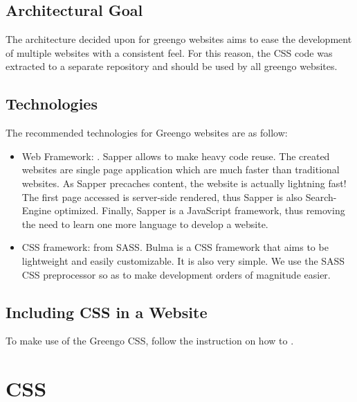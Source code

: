 \documentclass[letterpaper,10pt,english]{sphinxmanual}
\begin{document}
\subsection{Architectural Goal}
\label{\detokenize{websites/greengo_websites:architectural-goal}}
The architecture decided upon for greengo websites aims to ease the development of multiple websites with a consistent feel.
For this reason, the CSS code was extracted to a separate repository and should be used by all greengo websites.


\subsection{Technologies}
\label{\detokenize{websites/greengo_websites:technologies}}
The recommended technologies for Greengo websites are as follow:
\begin{itemize}
\item {} 
Web Framework: .
Sapper allows to make heavy code reuse.
The created websites are single page application which are much faster than traditional websites.
As Sapper precaches content, the website is actually lightning fast!
The first page accessed is server-side rendered, thus Sapper is also Search-Engine optimized.
Finally, Sapper is a JavaScript framework, thus removing the need to learn one more language to develop a website.

\item {} 
CSS framework:  from SASS.
Bulma is a CSS framework that aims to be lightweight and easily customizable.
It is also very simple.
We use the SASS CSS preprocessor so as to make development orders of magnitude easier.

\end{itemize}


\subsection{Including CSS in a Website}
\label{\detokenize{websites/greengo_websites:including-css-in-a-website}}
To make use of the Greengo CSS, follow the instruction on how to {\hyperref[\detokenize{websites/css:include-css}]{}}.


\section{CSS}
\label{\detokenize{websites/css:css}}\label{\detokenize{websites/css::doc}}
\end{document}
